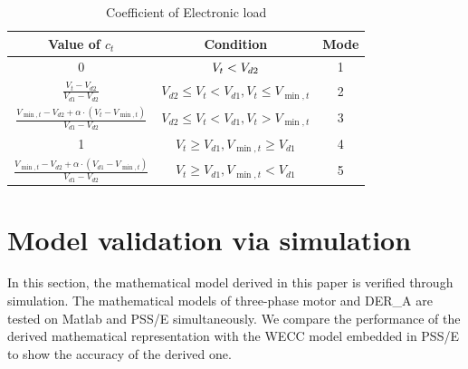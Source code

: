 \documentclass[journal]{IEEEtran}
\begin{document}
	\begin{table}[]
		\centering
		\caption{Coefficient of Electronic load \cite{Wang2019}}
		\label{table_valuec}
		\renewcommand{\arraystretch}{2.5}
		\setlength{\tabcolsep}{3pt}
		\begin{tabular}{ccc}
			\hline
			Value of $c_t$ & Condition & Mode \\ \hline
			0	&    { { $ \small {{V_t} < {V_{d2}}}$ }}       &   1    \\ \hline
			${\frac{{{V_t} - {V_{d2}}}}{{{V_{d1}} - {V_{d2}}}}}$	&   ${{V_{d2}} \le {V_t} < {V_{d1}},{V_t} \le {V_{\min ,t}}}$         &   2    \\ \hline
			${\frac{{{V_{\min ,t}} - {V_{d2}} + \alpha \cdot ({V_t} - {V_{\min ,t}})}}{{{V_{d1}} - {V_{d2}}}}}$	&     ${{V_{d2}} \le {V_t} < {V_{d1}},{V_t} > {V_{\min ,t}}}$       &   3    \\ \hline
			1	&    ${{V_t} \ge {V_{d1}},{V_{\min ,t}} \ge {V_{d1}}}$        &   4    \\ \hline
			${\frac{{{V_{\min ,t}} - {V_{d2}} + \alpha \cdot ({V_{d1}} - {V_{\min ,t}})}}{{{V_{d1}} - {V_{d2}}}}}$	&   ${{V_t} \ge {V_{d1}},{V_{\min ,t}} < {V_{d1}}}$        &   5   \\ \hline
		\end{tabular}
	\end{table}
	\section{Model validation via simulation}\label{C3}
	In this section, the mathematical model derived in this paper is verified through simulation. The mathematical models of three-phase motor and DER\_A are  tested  on Matlab and PSS/E simultaneously. We compare the performance of the derived mathematical representation with the WECC model embedded in PSS/E to show the accuracy of the derived one. 
\end{document}
